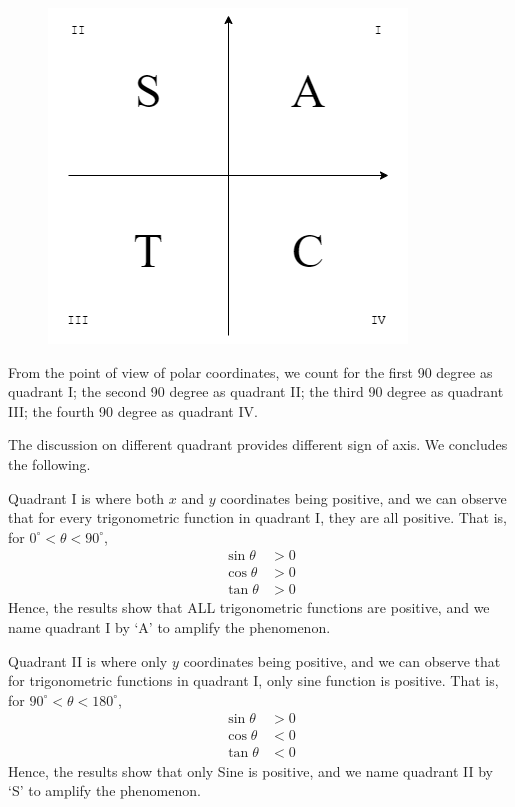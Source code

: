 \documentclass[12pt]{article}
\begin{document}
    \begin{figure}[H]
        \centering
        \includegraphics[scale=0.8]{C-A-S-T.png}
    \end{figure}

    From the point of view of polar coordinates, we count for the first 90 degree as quadrant I; the second 90 degree as quadrant II; the third 90 degree as quadrant III; the fourth 90 degree as quadrant IV. 

    The discussion on different quadrant provides different sign of axis. We concludes the following.

    Quadrant I is where both $x$ and $y$ coordinates being positive, and we can observe that for every trigonometric function in quadrant I, they are all positive. That is, for $0^\circ<\theta<90^\circ$, \begin{align*}
        \sin{\theta} &> 0\\
        \cos{\theta} &> 0\\
        \tan{\theta} &> 0
    \end{align*}
    Hence, the results show that ALL trigonometric functions are positive, and we name quadrant I by `A' to amplify the phenomenon.

    Quadrant II is where only $y$ coordinates being positive, and we can observe that for trigonometric functions in quadrant I, only sine function is positive. That is, for $90^\circ<\theta<180^\circ$, \begin{align*}
        \sin{\theta} &> 0\\
        \cos{\theta} &< 0\\
        \tan{\theta} &< 0
    \end{align*}
    Hence, the results show that only Sine is positive, and we name quadrant II by `S' to amplify the phenomenon.
\end{document}

